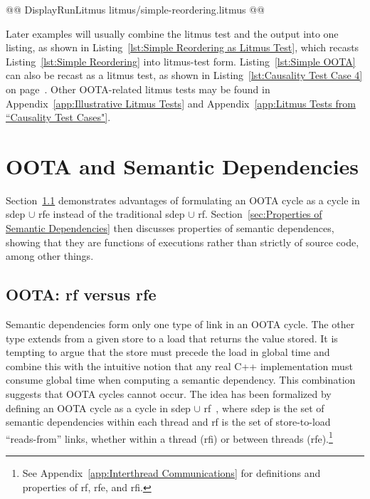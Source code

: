 \documentclass[10]{article}
\begin{document}
\begin{listing}[tbp]
@@ DisplayRunLitmus litmus/simple-reordering.litmus @@
\caption{Simple Reordering as Litmus Test}
\label{lst:Simple Reordering as Litmus Test}
\end{listing}

Later examples will usually combine the litmus test and the 
output into one listing, as shown in
Listing~\ref{lst:Simple Reordering as Litmus Test},
which recasts
Listing~\ref{lst:Simple Reordering}
into litmus-test form.
Listing~\ref{lst:Simple OOTA}
can also be recast as a  litmus test, as shown in
Listing~\ref{lst:Causality Test Case 4}
on page~\pageref{lst:Causality Test Case 4}.
Other OOTA-related litmus tests may be found in
Appendix~\ref{app:Illustrative Litmus Tests}
and
Appendix~\ref{app:Litmus Tests from “Causality Test Cases"}.

\section{OOTA and Semantic Dependencies}
\label{sec:OOTA and Semantic Dependencies}

Section~\ref{sec:OOTA: rf versus rfe}
demonstrates advantages of formulating an OOTA cycle as a cycle in
sdep $\cup$ rfe instead of the traditional sdep $\cup$ rf.
Section~\ref{sec:Properties of Semantic Dependencies}
then discusses properties of semantic dependences, showing that they
are functions of executions rather than strictly of source code,
among other things.

\subsection{OOTA: rf versus rfe}
\label{sec:OOTA: rf versus rfe}

Semantic dependencies form only one type of link in an OOTA cycle.
The other type extends from a given store to a load that returns the
value stored.
It is tempting to argue that the store must precede
the load in global time and combine this with the intuitive notion that
any real C++ implementation must consume global time when computing a
semantic dependency.
This combination suggests that OOTA cycles cannot occur.
The idea has been formalized by defining an OOTA cycle as a cycle
in sdep $\cup$ rf~\cite{PaulEMcKenney2014OOTA},
where sdep is the set of semantic dependencies within
each thread and rf is the set of store-to-load ``reads-from'' links,
whether within a thread
(rfi) or between threads (rfe).\footnote{
	See Appendix~\ref{app:Interthread Communications} for definitions
	and properties of rf, rfe, and rfi.}
\end{document}
